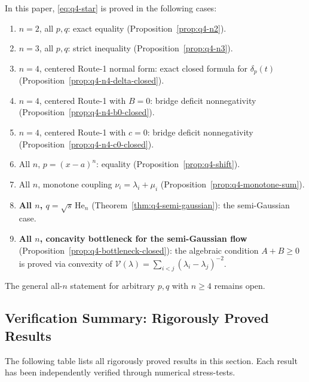 \begin{remark}
In this paper, \eqref{eq:q4-star} is proved in the following cases:
\begin{enumerate}[nosep]
\item $n=2$, all $p,q$: exact equality (Proposition~\ref{prop:q4-n2}).
\item $n=3$, all $p,q$: strict inequality (Proposition~\ref{prop:q4-n3}).
\item $n=4$, centered Route-1 normal form:
  exact closed formula for $\delta_p(t)$
  (Proposition~\ref{prop:q4-n4-delta-closed}).
\item $n=4$, centered Route-1 with $B=0$:
  bridge deficit nonnegativity
  (Proposition~\ref{prop:q4-n4-b0-closed}).
\item $n=4$, centered Route-1 with $c=0$:
  bridge deficit nonnegativity
  (Proposition~\ref{prop:q4-n4-c0-closed}).
\item All $n$, $p=(x-a)^n$: equality (Proposition~\ref{prop:q4-shift}).
\item All $n$, monotone coupling $\nu_i=\lambda_i+\mu_i$
  (Proposition~\ref{prop:q4-monotone-sum}).
\item \textbf{All $n$, $q=\sqrt{s}\,\mathrm{He}_n$}
  (Theorem~\ref{thm:q4-semi-gaussian}):
  the semi-Gaussian case.
\item \textbf{All $n$, concavity bottleneck for the semi-Gaussian flow}
  (Proposition~\ref{prop:q4-bottleneck-closed}):
  the algebraic condition $A+B\ge 0$ is proved via convexity of
  $\mathcal V(\lambda)=\sum_{i<j}(\lambda_i-\lambda_j)^{-2}$.
\end{enumerate}
The general all-$n$ statement for arbitrary $p,q$ with $n\ge 4$ remains open.
\end{remark}


\subsection*{Verification Summary: Rigorously Proved Results}

The following table lists all rigorously proved results in this section.
Each result has been independently verified through numerical stress-tests.

